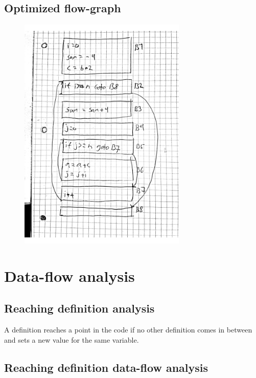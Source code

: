 \documentclass[paper=a4, fontsize=11pt]{scrartcl} %
\numberwithin{equation}{section} %
\numberwithin{figure}{section} %
\numberwithin{table}{section} %
\begin{document}
\subsection{Optimized flow-graph}

\begin{figure}[ht!]
\centering
\includegraphics[width=80mm]{2c.pdf}
\end{figure}

\newpage

\section{Data-flow analysis}

\subsection{Reaching definition analysis}

A definition reaches a point in the code if no other definition comes in between and sets a new value for the same variable.

\subsection{Reaching definition data-flow analysis}
\end{document}
